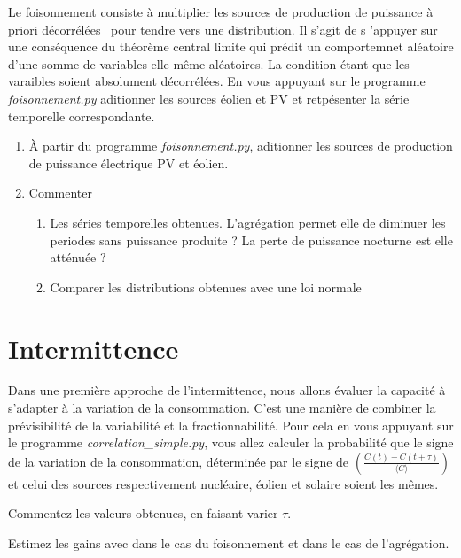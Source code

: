 \documentclass{article}
\newcommand{\tmtextit}[1]{{\itshape{#1}}}
\begin{document}
Le foisonnement consiste à multiplier les sources de production de puissance
à priori décorrélées \ pour tendre vers une distribution. Il s'agit de s
'appuyer sur une conséquence du théorème central limite qui prédit un
comportemnet aléatoire d'une somme de variables elle même aléatoires. La
condition étant que les varaibles soient absolument décorrélées. En vous
appuyant sur le programme \tmtextit{foisonnement.py} aditionner les sources
éolien et PV et retpésenter la série temporelle correspondante.
\begin{enumerate}
  \item À partir du programme \tmtextit{foisonnement.py}, aditionner les
  sources de production de puissance électrique PV et éolien.
  
  \item Commenter
  \begin{enumerate}
    \item Les séries temporelles obtenues. L'agrégation permet elle de
    diminuer les periodes sans puissance produite ? La perte de puissance
    nocturne est elle atténuée ?
    
    \item Comparer les distributions obtenues avec une loi normale
  \end{enumerate}
\end{enumerate}

\section{Intermittence}

Dans une première approche de l'intermittence, nous allons évaluer la
capacité à s'adapter à la variation de la consommation. C'est une manière
de combiner la prévisibilité de la variabilité et la fractionnabilité.
Pour cela en vous appuyant sur le programme \tmtextit{correlation\_simple.py},
vous allez calculer la probabilité que le signe de la variation de la
consommation, déterminée par le signe de $\left( \frac{C (t) - C (t +
\tau)}{\langle C \rangle} \right)$ et celui des sources respectivement
nucléaire, éolien et solaire soient les mêmes.

Commentez les valeurs obtenues, en faisant varier $\tau$.

Estimez les gains avec dans le cas du foisonnement et dans le cas de
l'agrégation.

\
\end{document}
